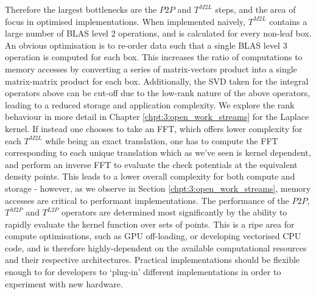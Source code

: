 Therefore the largest bottlenecks are the $P2P$ and $T^{M2L}$ steps, and the area of focus in optimised implementations. When implemented naively, $T^{M2L}$ contains a large number of BLAS level 2 operations, and is calculated for every non-leaf box. An obvious optimisation is to re-order data such that a single BLAS level 3 operation is computed for each box. This increases the ratio of computations to memory accesses by converting a series of matrix-vectors product into a single matrix-matrix product for each box. Additionally, the SVD taken for the integral operators above can be cut-off due to the low-rank nature of the above operators, leading to a reduced storage and application complexity. We explore the rank behaviour in more detail in Chapter \ref{chpt:3:open_work_streams} for the Laplace kernel. If instead one chooses to take an FFT, which offers lower complexity for each $T^{M2L}$ while being an exact translation, one has to compute the FFT corresponding to each unique translation which as we've seen is kernel dependent, and perform an inverse FFT to evaluate the check potentials at the equivalent density points. This leads to a lower overall complexity for both compute and storage - however, as we observe in Section \ref{chpt:3:open_work_streams}, memory accesses are critical to performant implementations. The performance of the $P2P$, $T^{M2P}$ and $T^{L2P}$ operators are determined most significantly by the ability to rapidly evaluate the kernel function over sets of points. This is a ripe area for compute optimisations, such as GPU off-loading, or developing vectorised CPU code, and is therefore highly-dependent on the available computational resources and their respective architectures. Practical implementations should be flexible enough to for developers to `plug-in' different implementations in order to experiment with new hardware.

